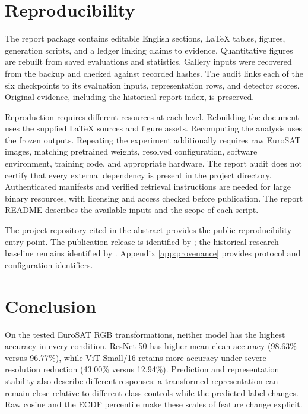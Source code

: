 \section{Reproducibility}\label{sec:repro}

The report package contains editable English sections, LaTeX tables, figures, generation scripts, and a ledger linking claims to evidence. Quantitative figures are rebuilt from saved evaluations and statistics. Gallery inputs were recovered from the backup and checked against recorded hashes. The audit links each of the six checkpoints to its evaluation inputs, representation rows, and detector scores. Original evidence, including the historical report index, is preserved.

Reproduction requires different resources at each level. Rebuilding the document uses the supplied LaTeX sources and figure assets. Recomputing the analysis uses the frozen outputs. Repeating the experiment additionally requires raw EuroSAT images, matching pretrained weights, resolved configuration, software environment, training code, and appropriate hardware. The report audit does not certify that every external dependency is present in the project directory. Authenticated manifests and verified retrieval instructions are needed for large binary resources, with licensing and access checked before publication. The report README describes the available inputs and the scope of each script.

The project repository cited in the abstract provides the public reproducibility entry point. The publication release is identified by ; the historical research baseline remains identified by . Appendix \ref{app:provenance} provides protocol and configuration identifiers.

\section{Conclusion}

On the tested EuroSAT RGB transformations, neither model has the highest accuracy in every condition. ResNet-50 has higher mean clean accuracy (98.63\% versus 96.77\%), while ViT-Small/16 retains more accuracy under severe resolution reduction (43.00\% versus 12.94\%). Prediction and representation stability also describe different responses: a transformed representation can remain close relative to different-class controls while the predicted label changes. Raw cosine and the ECDF percentile make these scales of feature change explicit.

